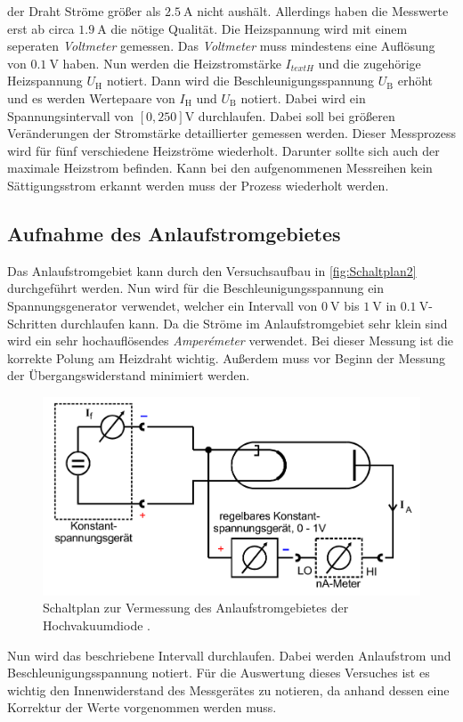 der Draht Ströme größer als $\qty{2.5}{\ampere}$ nicht aushält. Allerdings haben die Messwerte erst ab circa $\qty{1.9}{\ampere}$ die nötige Qualität. Die Heizspannung wird 
mit einem seperaten \textit{Voltmeter} gemessen. Das \textit{Voltmeter} muss mindestens eine Auflösung von $\qty{0.1}{\volt}$ haben. Nun werden die Heizstromstärke $I_{text{H}}$
und die zugehörige Heizspannung $U_\text{H}$ notiert. Dann wird die Beschleunigungsspannung $U_\text{B}$ erhöht und es werden Wertepaare von $I_\text{H}$ und $U_\text{B}$ 
notiert. Dabei wird ein Spannungsintervall von $[0,250]\unit{\volt}$ durchlaufen. Dabei soll bei größeren Veränderungen der Stromstärke detaillierter gemessen werden. Dieser 
Messprozess wird für fünf verschiedene Heizströme wiederholt. Darunter sollte sich auch der maximale Heizstrom befinden. Kann bei den aufgenommenen Messreihen kein 
Sättigungsstrom erkannt werden muss der Prozess wiederholt werden. 
\subsection{Aufnahme des Anlaufstromgebietes}
\label{subsec:Anlaufstromgebiet}
Das Anlaufstromgebiet kann durch den Versuchsaufbau in \autoref{fig:Schaltplan2} durchgeführt werden. Nun wird für die Beschleunigungsspannung ein Spannungsgenerator verwendet, 
welcher ein Intervall von $\qty{0}{\volt}$ bis $\qty{1}{\volt}$ in $\qty{0.1}{\volt}$-Schritten durchlaufen kann. Da die Ströme im Anlaufstromgebiet sehr klein sind wird ein
sehr hochauflösendes \textit{Amperémeter} verwendet. Bei dieser Messung ist die korrekte Polung am Heizdraht wichtig. Außerdem muss vor Beginn der Messung der 
Übergangswiderstand minimiert werden. 
\begin{figure}
    \centering
    \includegraphics[width = .6\textwidth]{content/Schaltplan2.png}
    \caption{Schaltplan zur Vermessung des Anlaufstromgebietes der Hochvakuumdiode \cite{v504}.}
    \label{fig:Schaltplan2}
\end{figure}
Nun wird das beschriebene Intervall durchlaufen. Dabei werden Anlaufstrom und Beschleunigungsspannung notiert. Für die Auswertung dieses Versuches ist es wichtig den 
Innenwiderstand des Messgerätes zu notieren, da anhand dessen eine Korrektur der Werte vorgenommen werden muss.